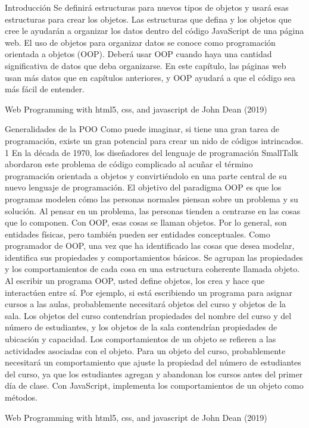 \begin{frame}{Introducción}
\justifying
Se definirá estructuras para nuevos tipos de objetos y usará esas estructuras para crear los objetos. Las estructuras que defina y los objetos que cree le ayudarán a organizar los datos dentro del código JavaScript de una página web. El uso de objetos para organizar datos se conoce como programación orientada a objetos (OOP). Deberá usar OOP cuando haya una cantidad significativa de datos que deba organizarse. En este capítulo, las páginas web usan más datos que en capítulos anteriores, y OOP ayudará a que el código sea más fácil de entender.

{\tiny Web Programming with html5, css, and javascript de John Dean (2019)}
\end{frame}

\begin{frame}{Generalidades de la POO}
\justifying
Como puede imaginar, si tiene una gran tarea de programación, existe un gran potencial para crear un nido de códigos intrincados. 1 En la década de 1970, los diseñadores del lenguaje de programación SmallTalk abordaron este problema de código complicado al acuñar el término programación orientada a objetos y
convirtiéndolo en una parte central de su nuevo lenguaje de programación.
El objetivo del paradigma OOP es que los programas modelen cómo las personas normales piensan sobre un problema y su solución. Al pensar en un problema, las personas tienden a centrarse en las cosas que lo componen. Con OOP, esas cosas se llaman objetos. Por lo general, son entidades físicas, pero también pueden ser entidades conceptuales. Como programador de OOP, una vez que ha identificado las cosas que desea modelar, identifica sus propiedades y comportamientos básicos. Se agrupan las propiedades y los comportamientos de cada cosa en una estructura coherente llamada objeto. Al escribir un programa OOP, usted define objetos, los crea y hace que interactúen entre sí.
Por ejemplo, si está escribiendo un programa para asignar cursos a las aulas, probablemente necesitará objetos del curso y objetos de la sala. Los objetos del curso contendrían propiedades del nombre del curso y del número de estudiantes, y los objetos de la sala contendrían propiedades de ubicación y capacidad. Los comportamientos de un objeto se refieren a las actividades asociadas con el objeto. Para un objeto del curso, probablemente necesitará un comportamiento que ajuste la propiedad del número de estudiantes del curso, ya que los estudiantes agregan y abandonan los cursos antes del primer día de clase. Con JavaScript, implementa los comportamientos de un objeto como métodos.


{\tiny Web Programming with html5, css, and javascript de John Dean (2019)}
\end{frame}

